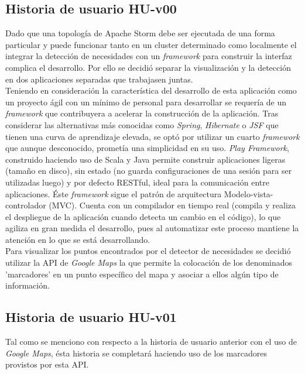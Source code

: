 \subsection{Historia de usuario HU-v00}
\label{subsec:HU-v00}

Dado que una topología de Apache Storm debe ser ejecutada de una forma particular y puede funcionar tanto en un cluster determinado como localmente el integrar la detección de necesidades con un \textit{framework} para construir la interfaz complica el desarrollo. Por ello se decidió separar la visualización y la detección en dos aplicaciones separadas que trabajasen juntas.\\

Teniendo en consideración la característica del desarrollo de esta aplicación como un proyecto ágil con un mínimo de personal para desarrollar se requería de un \textit{framework} que contribuyera a acelerar la construcción de la aplicación. Tras considerar las alternativas más conocidas como \textit{Spring}, \textit{Hibernate} o \textit{JSF} que tienen una curva de aprendizaje elevada, se optó por utilizar un cuarto \textit{framework} que aunque desconocido, prometía una simplicidad en su uso. \textit{Play Framework}, construido haciendo uso de Scala y Java permite construir aplicaciones ligeras (tamaño en disco), sin estado (no guarda configuraciones de una sesión para ser utilizadas luego) y por defecto RESTful, ideal para la comunicación entre aplicaciones. Éste \textit{framework} sigue el patrón de arquitectura Modelo-vista-controlador (MVC). Cuenta con un compilador en tiempo real (compila y realiza el despliegue de la aplicación cuando detecta un cambio en el código), lo que agiliza en gran medida el desarrollo, pues al automatizar este proceso mantiene la atención en lo que se está desarrollando.\\

Para visualizar los puntos encontrados por el detector de necesidades se decidió utilizar la API de \textit{Google Maps} la que permite la colocación de los denominados 'marcadores' en un punto específico del mapa y asociar a ellos algún tipo de información.\\

\subsection{Historia de usuario HU-v01}
\label{subsec:HU-v01}

Tal como se menciono con respecto a la historia de usuario anterior con el uso de \textit{Google Maps}, ésta historia se completará haciendo uso de los marcadores provistos por esta API.\\

